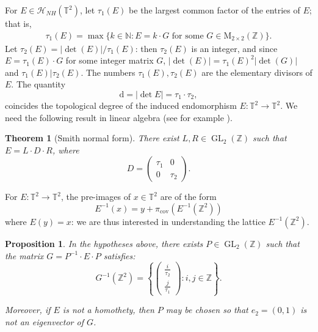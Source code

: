 \documentclass[11pt,letterpaper,reqno]{article}
\newtheorem{proposition}{Proposition}[section]
\newtheorem{theorem}{Theorem}[section]
\newcommand{\Tor}{\mathbb{T}^2}
\newcommand{\Z}{\mathbb{Z}}
\newcommand{\N}{\mathbb{N}}
\newcommand{\TT}{\mathbb{T}^2}
\newcommand{\ZZ}{\mathbb{Z}^2}
\newcommand{\Mat}{\mathrm{M}_{2 \times 2}(\mathbb{Z})}
\DeclareMathOperator{\GL}{GL}
\newcommand{\pcov}{\pi_{\mathrm{cov}}}
\begin{document}
 For $E\in \mathscr{H}_{NH}(\Tor)$, let $\tau_1(E)$ be the largest common factor of the entries of $E$; that is,
\begin{align}
 \tau_1(E) = \max\{ k \in \N: E = k\cdot G \text{ for some }G \in \Mat\}.
 \end{align}
Let $\tau_2(E) = |\det(E)|/\tau_1(E)$: then $\tau_2(E)$ is an integer, and since $E=\tau_1(E)\cdot G$ for some integer matrix $G$, $|\det(E)|=\tau_1(E)^2|\det(G)|$ and $\tau_1(E) | \tau_2(E)$. The numbers $\tau_1(E), \tau_2(E)$ are the elementary divisors of $E$. The quantity
\[
\mathrm{d}=| \det E |= \tau_1\cdot \tau_2,
\]
coincides the topological degree of the induced endomorphism $E:\Tor\to\Tor$. We need the following result in linear algebra (see for example \cite{Jacobson2009}).



\begin{theorem}[Smith normal form]
There exist $L, R \in \GL_2(\Z)$ such that $E = L\cdot D\cdot R$, where
\[D = \left(\begin{matrix}
\tau_1 & 0 \\
0 & \tau_2
\end{matrix} \right) .\]
\end{theorem}

For $E:\Tor\to\Tor$, the pre-images of $x\in\TT$ are of the form
\[
E^{-1}(x)=y+\pcov(E^{-1}(\ZZ))
\]
where $E(y)=x$: we are thus interested in understanding the lattice $E^{-1}(\ZZ)$.


\begin{proposition}\label{SNF}
In the hypotheses above, there exists $P \in \GL_2(\Z)$ such that the matrix $G = P^{-1}\cdot E \cdot P$ satisfies:
\begin{equation} \label{preimages}
G^{-1}(\ZZ) = \left\{ \left( \begin{smallmatrix}
\frac{i}{\tau_2} \\
\frac{j}{\tau_1} 
\end{smallmatrix} \right) : i, j \in \Z \right\}.
\end{equation}

Moreover, if $E$ is not a homothety, then $P$ may be chosen so that $e_2=(0,1)$ is not an eigenvector of $G$.

\end{proposition}
\end{document}
